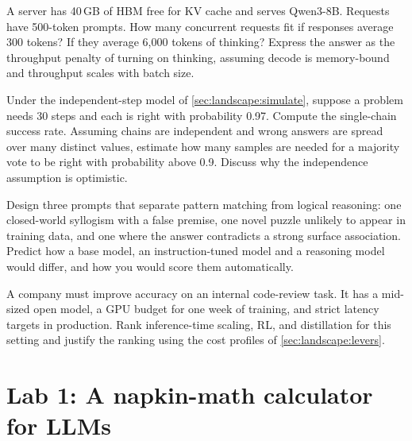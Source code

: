 \begin{exercise}
A server has 40\,GB of HBM free for KV cache and serves Qwen3-8B. Requests have 500-token prompts. How
many concurrent requests fit if responses average 300 tokens? If they average 6{,}000 tokens of
thinking? Express the answer as the throughput penalty of turning on thinking, assuming decode is
memory-bound and throughput scales with batch size.
\end{exercise}

\begin{exercise}
Under the independent-step model of \cref{sec:landscape:simulate}, suppose a problem needs 30 steps and
each is right with probability 0.97. Compute the single-chain success rate. Assuming chains are
independent and wrong answers are spread over many distinct values, estimate how many samples are needed
for a majority vote to be right with probability above 0.9. Discuss why the independence assumption is
optimistic.
\end{exercise}

\begin{exercise}
Design three prompts that separate pattern matching from logical reasoning: one closed-world syllogism
with a false premise, one novel puzzle unlikely to appear in training data, and one where the answer
contradicts a strong surface association. Predict how a base model, an instruction-tuned model and a
reasoning model would differ, and how you would score them automatically.
\end{exercise}

\begin{exercise}
A company must improve accuracy on an internal code-review task. It has a mid-sized open model, a
GPU budget for one week of training, and strict latency targets in production. Rank inference-time
scaling, RL, and distillation for this setting and justify the ranking using the cost profiles of
\cref{sec:landscape:levers}.
\end{exercise}

\section{Lab 1: A napkin-math calculator for LLMs}\label{sec:landscape:lab}

